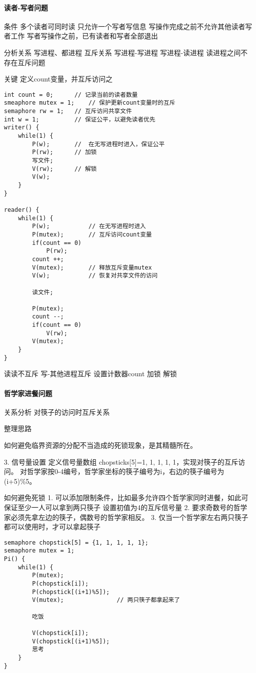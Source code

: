 \paragraph{读者-写者问题}
条件
多个读者可同时读
只允许一个写者写信息
写操作完成之前不允许其他读者写者工作
写者写操作之前，已有读者和写者全部退出

分析关系
写进程、都进程
互斥关系
写进程-写进程
写进程-读进程
读进程之间不存在互斥问题

关键  
定义count变量，并互斥访问之

\begin{lstlisting}
int count = 0;		// 记录当前的读者数量
smeaphore mutex = 1;	// 保护更新count变量时的互斥
semaphore rw = 1;	// 互斥访问共享文件
int w = 1;			// 保证公平，以避免读者优先
writer() {
	while(1) {
		P(w);		//  在无写进程时进入，保证公平 
		P(rw);		// 加锁 
		写文件;
		V(rw);		// 解锁
		V(w);	
	}
}

reader() {
	while(1) {
		P(w);			// 在无写进程时进入 
		P(mutex);		// 互斥访问count变量 
		if(count == 0) 
			P(rw);
		count ++;		
		V(mutex);		// 释放互斥变量mutex
		V(w);			// 恢复对共享文件的访问 	
		
		读文件;
		
		P(mutex);		
		count --;
		if(count == 0)
			V(rw);
		V(mutex);
	}
}
\end{lstlisting}

读读不互斥
写-其他进程互斥
设置计数器count 加锁 解锁


\paragraph{哲学家进餐问题}
关系分析
对筷子的访问时互斥关系

整理思路

如何避免临界资源的分配不当造成的死锁现象，是其精髓所在。

3. 信号量设置
定义信号量数组 chopsticks[5]={1, 1, 1, 1, 1}，实现对筷子的互斥访问。
对哲学家按0-4编号，哲学家坐标的筷子编号为i，右边的筷子编号为(i+5)\%5。


如何避免死锁
1. 可以添加限制条件，比如最多允许四个哲学家同时进餐，如此可保证至少一人可以拿到两只筷子
	设置初值为4的互斥信号量
2. 要求奇数号的哲学家必须先拿左边的筷子，偶数号的哲学家相反。
3. 仅当一个哲学家左右两只筷子都可以使用时，才可以拿起筷子
\begin{lstlisting}
semaphore chopstick[5] = {1, 1, 1, 1, 1};
semaphore mutex = 1;
Pi() {
	while(1) {
		P(mutex);
		P(chopstick[i]);
		P(chopstick[(i+1)%5]);
		V(mutex);				// 两只筷子都拿起来了
		
		吃饭
		
		V(chopstick[i]);
		V(chopstick[(i+1)%5]);
		思考
	}
}
\end{lstlisting}

